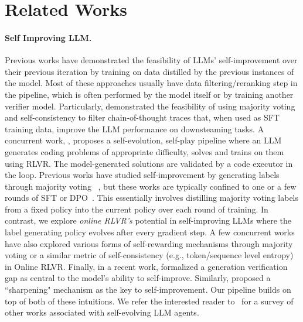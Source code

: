 \section{Related Works}\label{sec:related_work}
\paragraph{Self Improving LLM.} Previous works \citep{zelikman2022star, wang-etal-2023-self-instruct, huang-etal-2023-large, madaan2023self,10.5555/3692070.3692326, gulcehre2023reinforcedselftrainingrestlanguage, singh2024beyond, DBLP:conf/iclr/NiIWPMRG23, DBLP:conf/emnlp/HwangKKYS24, havrilla2024glorewhenwhereimprove, pang2024language} have demonstrated the feasibility of LLMs' self-improvement over their previous iteration by training on data distilled by the previous instances of the model. Most of these approaches usually have data filtering/reranking step in the pipeline, which is often performed by the model itself \citep{wu2025metarewarding} or by training another \citep{hosseini2024vstar} verifier model.  Particularly, \citep{huang-etal-2023-large, wang2023selfconsistency,prasad2024selfconsistencypreferenceoptimization} demonstrated the feasibility of using majority voting and self-consistency to filter chain-of-thought traces that, when used as SFT training data, improve the LLM performance on downsteaming tasks. A concurrent work, \citep{zhao2025absolutezeroreinforcedselfplay}, proposes a self-evolution, self-play pipeline where an LLM generates coding problems of appropriate difficulty, solves and trains on them using RLVR. The model-generated solutions are validated by a code executor in the loop. 
Previous works have studied self-improvement by generating labels through majority voting ~\citep{prasad2024selfconsistencypreferenceoptimization, huang-etal-2023-large}, but these works are typically confined to one or a few rounds of SFT or DPO~\citep{rafailov2024directpreferenceoptimizationlanguage}. This essentially involves distilling majority voting labels from a fixed policy into the current policy over each round of training. In contrast, we explore \textit{online RLVR's} potential in self-improving LLMs where the label generating policy evolves after every gradient step. A few concurrent works~\citep{chen2025selfquestioninglanguagemodels,prabhudesai2025maximizingconfidenceimprovesreasoning,zhao2025learningreasonexternalrewards,shao2025spuriousrewardsrethinkingtraining} have also explored various forms of self-rewarding mechanisms through majority voting or a similar metric of self-consistency (e.g., token/sequence level entropy) in Online RLVR. 
Finally, in a recent work, \citep{song2025mind} formalized a generation verification gap as central to the model's ability to self-improve. Similarly, \citep{huang2025selfimprovement} proposed a ``sharpening" mechanism as the key to self-improvement. Our \algo{} pipeline builds on top of both of these intuitions. We refer the interested reader to~\citet{gao2025surveyselfevolvingagentspath} for a survey of other works associated with self-evolving LLM agents.

